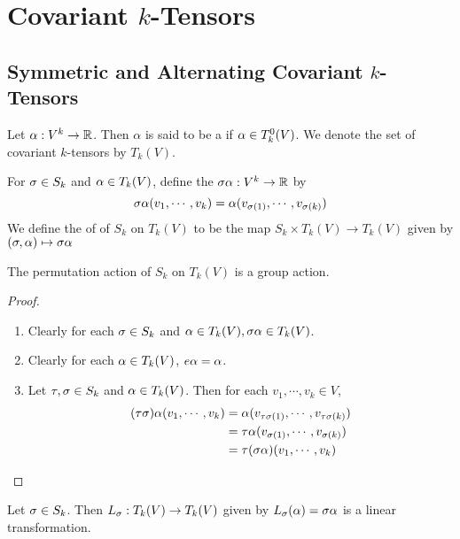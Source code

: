 \documentclass{book}
\begin{document}
	
	\newpage
	\section{Covariant $k$-Tensors}	
	
	\subsection{Symmetric and Alternating Covariant $k$-Tensors}
	
	\begin{defn}
		Let $\alpha: V^k \rightarrow \mathbb{R}$. Then $\alpha$ is said to be a  if $\alpha \in T^0_k(V)$. We denote the set of covariant $k$-tensors by $T_k(V)$.
	\end{defn}

	\begin{defn}
		For $\sigma \in S_k$ and $\alpha \in T_k(V)$, define the $\sigma \alpha : V^k \rightarrow \mathbb{R}$ by $$\sigma \alpha(v_1, \cdots, v_k) = \alpha(v_{\sigma(1)}, \cdots, v_{\sigma(k)})$$  
		We define the  of of $S_k$ on $T_k(V)$ to be the map $S_k \times T_k(V) \rightarrow T_k(V)$ given by $(\sigma, \alpha) \mapsto \sigma \alpha$
	\end{defn}

	\begin{ex}
		The permutation action of $S_k$ on $T_k(V)$ is a group action.
	\end{ex}

	\begin{proof} \
		\begin{enumerate}
			\item Clearly for each $\sigma \in S_k$ and $\alpha \in T_k(V), \sigma \alpha \in T_k(V) $.
			\item Clearly for each $\alpha \in T_k(V)$, $e \alpha = \alpha$.
			\item Let $\tau, \sigma \in S_k$ and $\alpha \in T_k(V)$. Then for each $v_1, \cdots, v_k \in V$, 
			\begin{align*}
				(\tau \sigma) \alpha(v_1, \cdots, v_k) 
				&= \alpha(v_{\tau \sigma (1)}, \cdots, v_{\tau \sigma (k)}) \\
				&= \tau \alpha(v_{ \sigma (1)}, \cdots, v_{ \sigma (k)}) \\ 
				&= \tau (\sigma \alpha) (v_1, \cdots, v_k) 
			\end{align*}
		\end{enumerate}
	\end{proof}

	\begin{ex}
		Let $\sigma \in S_k$. Then $L_{\sigma}: T_k(V) \rightarrow T_k(V)$ given by $ L_{\sigma}(\alpha) = \sigma \alpha$ is a linear transformation.
	\end{ex}
\end{document}
